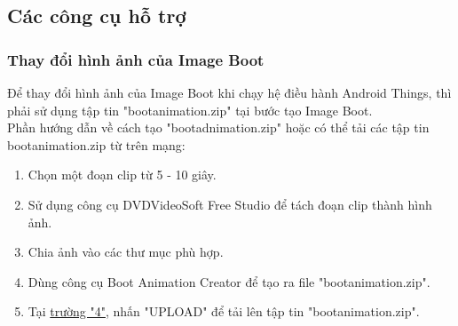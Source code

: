\subsection{Các công cụ hỗ trợ}
\subsubsection{Thay đổi hình ảnh của Image Boot}
\label{bootanimation}
Để thay đổi hình ảnh của Image Boot khi chạy hệ điều hành Android Things, thì phải sử dụng tập tin "bootanimation.zip" tại bước tạo Image Boot.\\
Phần hướng dẫn về cách tạo "bootadnimation.zip" hoặc có thể tải các tập tin bootanimation.zip từ trên mạng:

\begin{enumerate}
\item Chọn một đoạn clip từ 5 - 10 giây.
\item Sử dụng công cụ DVDVideoSoft Free Studio để tách đoạn clip thành hình ảnh.
\item Chia ảnh vào các thư mục phù hợp.
\item Dùng công cụ Boot Animation Creator để tạo ra file "bootanimation.zip".
\item Tại \hyperref[truong4]{trường "4"}, nhấn "UPLOAD" để tải lên tập tin "bootanimation.zip".


\end{enumerate}
